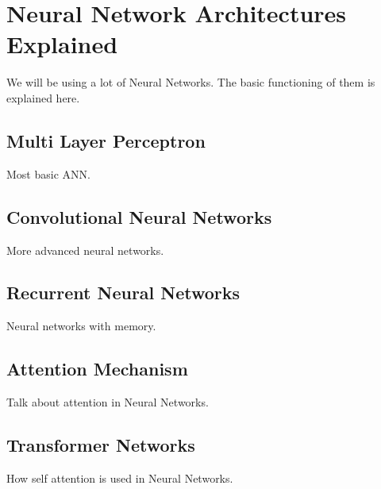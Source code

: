 \section{Neural Network Architectures Explained}
We will be using a lot of Neural Networks. The basic functioning of them is explained here.

\subsection{Multi Layer Perceptron}
Most basic ANN.

\subsection{Convolutional Neural Networks}
More advanced neural networks.

\subsection{Recurrent Neural Networks}
Neural networks with memory.

\subsection{Attention Mechanism}
Talk about attention in Neural Networks.

\subsection{Transformer Networks}
How self attention is used in Neural Networks.
